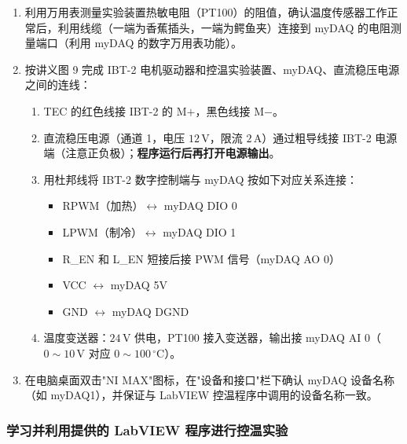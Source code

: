 \documentclass[dvipsnames, svgnames,a4paper,11pt]{article}
\begin{document}
\begin{enumerate}
	\item 利用万用表测量实验装置热敏电阻（PT100）的阻值，确认温度传感器工作正常后，利用线缆（一端为香蕉插头，一端为鳄鱼夹）连接到 myDAQ 的电阻测量端口（利用 myDAQ 的数字万用表功能）。

	\item 按讲义图 9 完成 IBT-2 电机驱动器和控温实验装置、myDAQ、直流稳压电源之间的连线：
	\begin{enumerate}
		\item TEC 的红色线接 IBT-2 的 M$+$，黑色线接 M$-$。
		\item 直流稳压电源（通道 1，电压 $12\,\mathrm{V}$，限流 $2\,\mathrm{A}$）通过粗导线接 IBT-2 电源端（注意正负极）；\textbf{程序运行后再打开电源输出}。
		\item 用杜邦线将 IBT-2 数字控制端与 myDAQ 按如下对应关系连接：
		\begin{itemize}
			\item RPWM（加热）$\longleftrightarrow$ myDAQ DIO 0
			\item LPWM（制冷）$\longleftrightarrow$ myDAQ DIO 1
			\item R\_EN 和 L\_EN 短接后接 PWM 信号（myDAQ AO 0）
			\item VCC $\longleftrightarrow$ myDAQ 5V
			\item GND $\longleftrightarrow$ myDAQ DGND
		\end{itemize}
		\item 温度变送器：$24\,\mathrm{V}$ 供电，PT100 接入变送器，输出接 myDAQ AI 0（$0\sim10\,\mathrm{V}$ 对应 $0\sim100\,^\circ\mathrm{C}$）。
	\end{enumerate}

	\item 在电脑桌面双击"NI MAX"图标，在"设备和接口"栏下确认 myDAQ 设备名称（如 myDAQ1），并保证与 LabVIEW 控温程序中调用的设备名称一致。
\end{enumerate}


\subsubsection{学习并利用提供的 LabVIEW 程序进行控温实验}
\end{document}
